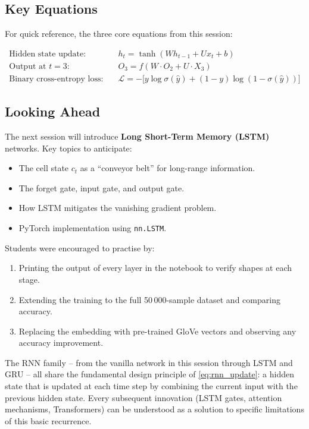 \documentclass[12pt,a4paper]{article}
\begin{document}
\subsection{Key Equations}
\label{subsec:key_equations}

For quick reference, the three core equations from this session:

\begin{align}
  \text{Hidden state update:} &\quad
    h_t = \tanh(W h_{t-1} + U x_t + b)
    \label{eq:hidden_summary} \\
  \text{Output at } t=3: &\quad
    O_3 = f(W \cdot O_2 + U \cdot X_3)
    \label{eq:o3_summary} \\
  \text{Binary cross-entropy loss:} &\quad
    \mathcal{L} = -\bigl[y \log \sigma(\hat{y})
                       + (1-y)\log(1-\sigma(\hat{y}))\bigr]
    \label{eq:bce_summary}
\end{align}

\subsection{Looking Ahead}
\label{subsec:ahead}

The next session will introduce \textbf{Long Short-Term Memory (LSTM)}
networks.  Key topics to anticipate:

\begin{itemize}[noitemsep]
  \item The cell state $c_t$ as a ``conveyor belt'' for long-range information.
  \item The forget gate, input gate, and output gate.
  \item How LSTM mitigates the vanishing gradient problem.
  \item PyTorch implementation using \texttt{nn.LSTM}.
\end{itemize}

Students were encouraged to practise by:
\begin{enumerate}[noitemsep,label=(\roman*)]
  \item Printing the output of every layer in the notebook to verify
        shapes at each stage.
  \item Extending the training to the full 50\,000-sample dataset and
        comparing accuracy.
  \item Replacing the embedding with pre-trained GloVe vectors and
        observing any accuracy improvement.
\end{enumerate}

\begin{keyinsight}[title=The Big Picture]
  The RNN family -- from the vanilla network in this session through
  LSTM and GRU -- all share the fundamental design principle of
  \cref{eq:rnn_update}: a hidden state that is updated at each time
  step by combining the current input with the previous hidden state.
  Every subsequent innovation (LSTM gates, attention mechanisms,
  Transformers) can be understood as a solution to specific limitations
  of this basic recurrence.
\end{keyinsight}
\end{document}
